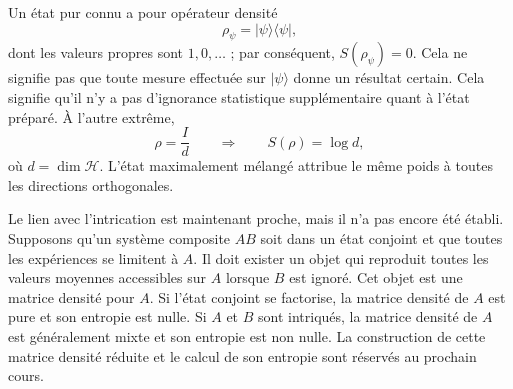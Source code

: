 Un état pur connu a pour opérateur densité
\begin{equation}
\rho_\psi=|\psi\rangle\langle\psi|,
\end{equation}
dont les valeurs propres sont \(1,0,\ldots\) ; par conséquent, \(S(\rho_\psi)=0\). Cela ne signifie pas que toute mesure effectuée sur \(|\psi\rangle\) donne un résultat certain. Cela signifie qu’il n’y a pas d’ignorance statistique supplémentaire quant à l’état préparé. À l’autre extrême,
\begin{equation}
\rho=\frac{I}{d}
\qquad\Longrightarrow\qquad
S(\rho)=\log d,
\end{equation}
où \(d=\dim\mathcal H\). L’état maximalement mélangé attribue le même poids à toutes les directions orthogonales.

Le lien avec l’intrication est maintenant proche, mais il n’a pas encore été établi. Supposons qu’un système composite \(AB\) soit dans un état conjoint et que toutes les expériences se limitent à \(A\). Il doit exister un objet qui reproduit toutes les valeurs moyennes accessibles sur \(A\) lorsque \(B\) est ignoré. Cet objet est une matrice densité pour \(A\). Si l’état conjoint se factorise, la matrice densité de \(A\) est pure et son entropie est nulle. Si \(A\) et \(B\) sont intriqués, la matrice densité de \(A\) est généralement mixte et son entropie est non nulle. La construction de cette matrice densité réduite et le calcul de son entropie sont réservés au prochain cours.
